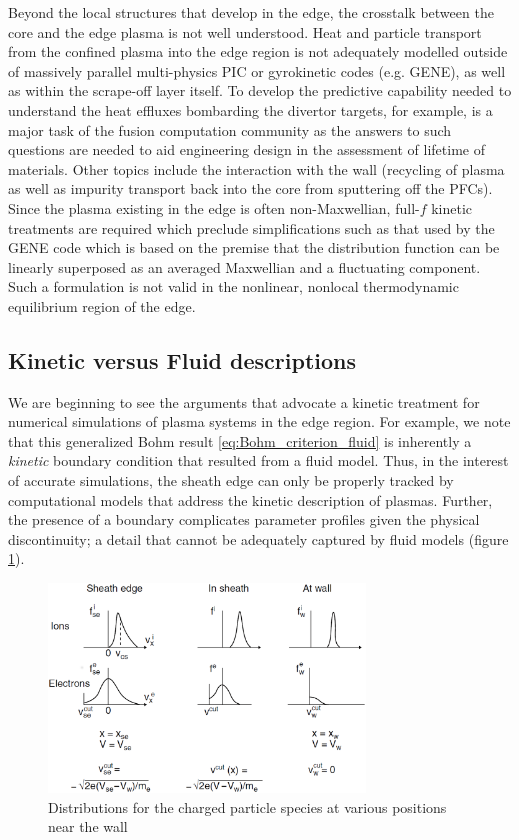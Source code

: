 \documentclass[11pt,titlepage]{report}
\begin{document}
\indent\indent Beyond the local structures that develop in the edge, the crosstalk between the core and the edge plasma is not well understood. Heat and particle transport from the confined plasma into the edge region is not adequately modelled outside of massively parallel multi-physics PIC or gyrokinetic codes (e.g. GENE), as well as within the scrape-off layer itself. To develop the predictive capability needed to understand the heat effluxes bombarding the divertor targets, for example, is a major task of the fusion computation community as the answers to such questions are needed to aid engineering design in the assessment of lifetime of materials. Other topics include the interaction with the wall (recycling of plasma as well as impurity transport back into the core from sputtering off the PFCs). Since the plasma existing in the edge is often non-Maxwellian, full-$f$ kinetic treatments are required which preclude simplifications such as that used by the GENE code which is based on the premise that the distribution function can be linearly superposed as an averaged Maxwellian and a fluctuating component. Such a formulation is not valid in the nonlinear, nonlocal thermodynamic equilibrium region of the edge.

\subsection{Kinetic versus Fluid descriptions}

\indent \indent We are beginning to see the arguments that advocate a kinetic treatment for numerical simulations of plasma systems in the edge region. For example, we note that this generalized Bohm result \eqref{eq:Bohm_criterion_fluid} is inherently a \emph{kinetic} boundary condition that resulted from a fluid model. Thus, in the interest of accurate simulations, the sheath edge can only be properly tracked by computational models that address the kinetic description of plasmas. Further, the presence of a boundary complicates parameter profiles given the physical discontinuity; a detail that cannot be adequately captured by fluid models (figure \ref{fig:Stangeby_edge_distributions}). 

\begin{figure}[h!]
  \centering
    \includegraphics[width=0.75\textwidth]{graphics/Stangeby_edge_distributions}
  \caption{Distributions for the charged particle species at various positions near the wall \cite{Stangeby}}
  \label{fig:Stangeby_edge_distributions}
\end{figure}
\end{document}
